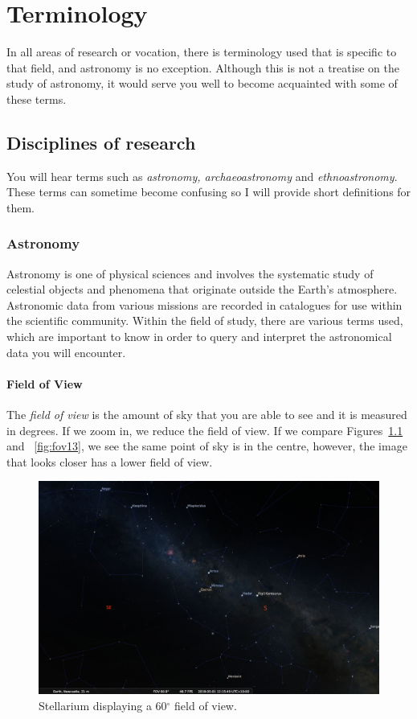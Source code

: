 
\chapter{Terminology}
In all areas of research or vocation, there is terminology used that is specific to that field, and astronomy is no exception. Although this is not a treatise on the study of astronomy, it would serve you well to become acquainted with some of these terms.

\section{Disciplines of research}

You will hear terms such as \textit{astronomy, archaeoastronomy} and \textit{ethnoastronomy}. These terms can sometime become confusing so I will provide short definitions for them.

\subsection{Astronomy}
Astronomy is one of physical sciences and involves the systematic study of celestial objects and phenomena that originate outside the Earth's atmosphere. Astronomic data from various missions are recorded in catalogues for use within the scientific community. Within the field of study, there are various terms used, which are important to know in order to query and interpret the astronomical data you will encounter.

\subsubsection{Field of View}
The \textit{field of view} is the amount of sky that you are able to see and it is measured in degrees.  If we zoom in, we reduce the field of view. If we compare Figures~\ref{fig:fov60} and ~\ref{fig:fov13}, we see the same point of sky is in the centre, however, the image that looks closer has a lower field of view.

\begin{figure}[htbp]
	\centering
	\includegraphics[width=1\columnwidth]{fov60}
	\caption{Stellarium displaying a 60$^{\circ}$ field of view.}
	\label{fig:fov60}
\end{figure}

